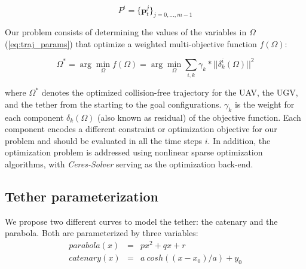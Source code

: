 \begin{equation}
\label{eq:tether}
    P^i = \{\mathbf{p}^j_t\}_{j=0,...,m-1}
\end{equation}

Our problem consists of determining the values of the variables in $\Omega$ (\ref{eq:traj_params}) that optimize a weighted multi-objective function $f(\Omega)$:  

\begin{equation}
\label{eq:cost_function}
     \Omega^* = \arg \min_\Omega f(\Omega) = \arg \min_\Omega  \sum_{i,k} \gamma_k * || \delta_k^i(\Omega) ||^2
\end{equation}

\noindent where $\Omega^*$ denotes the optimized collision-free trajectory for the UAV, the UGV, and the tether from the starting to the goal configurations. $\gamma_k$ is the weight for each component $\delta_k(\Omega)$ (also known as residual) of the objective function.  
 Each component encodes a different constraint or optimization objective for our problem and should be evaluated in all the time steps $i$.
In addition, the optimization problem is addressed using nonlinear sparse optimization algorithms, with \emph{Ceres-Solver} \cite{ceres-solver} serving as the optimization back-end.





\subsection{Tether parameterization}
\label{sec:tether_params}

We propose two different curves to model the tether: the catenary and the parabola. Both are parameterized by three variables:
\begin{eqnarray}
    parabola(x) &=& px^2+qx+r \\
    catenary(x) &=& a\ cosh( (x-x_0)/a) + y_0 
\end{eqnarray}

